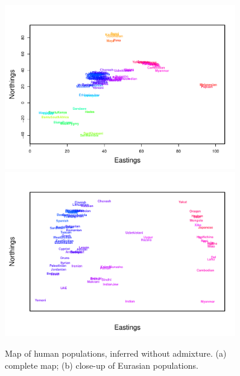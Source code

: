 \documentclass[12pt]{article}
\begin{document}
\begin{figure}
	\centering
			{\includegraphics[width=0.9\textwidth,height=0.738\textwidth]{figs/globetrotter/globe_NoAd_map.pdf}}
			{\includegraphics[width=0.9\textwidth,height=0.738\textwidth]{figs/globetrotter/globe_Eurasia_NoAd_map_indproc.pdf}}
	\caption{Map of human populations, inferred without admixture. (a) complete map; (b) close-up of Eurasian 
populations.}\label{sfig:globe_noad_maps}
\end{figure}
\end{document}
